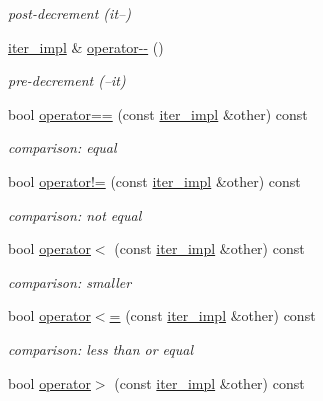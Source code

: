 \begin{DoxyCompactItemize}
\begin{DoxyCompactList}\small\item\em post-\/decrement (it--) \end{DoxyCompactList}\item 
\mbox{\hyperlink{classnlohmann_1_1detail_1_1iter__impl}{iter\+\_\+impl}} \& \mbox{\hyperlink{classnlohmann_1_1detail_1_1iter__impl_a84e689fb581d651d130039f7cb81494a}{operator-\/-\/}} ()
\begin{DoxyCompactList}\small\item\em pre-\/decrement (--it) \end{DoxyCompactList}\item 
bool \mbox{\hyperlink{classnlohmann_1_1detail_1_1iter__impl_a2b592605b63ae7f5401996ffa3b14393}{operator==}} (const \mbox{\hyperlink{classnlohmann_1_1detail_1_1iter__impl}{iter\+\_\+impl}} \&other) const
\begin{DoxyCompactList}\small\item\em comparison\+: equal \end{DoxyCompactList}\item 
bool \mbox{\hyperlink{classnlohmann_1_1detail_1_1iter__impl_aeab0e2b5da70b3bdebecd5b1a6ee66a6}{operator!=}} (const \mbox{\hyperlink{classnlohmann_1_1detail_1_1iter__impl}{iter\+\_\+impl}} \&other) const
\begin{DoxyCompactList}\small\item\em comparison\+: not equal \end{DoxyCompactList}\item 
bool \mbox{\hyperlink{classnlohmann_1_1detail_1_1iter__impl_a0d14cd76203e00bdcef6a64a5d055cc7}{operator$<$}} (const \mbox{\hyperlink{classnlohmann_1_1detail_1_1iter__impl}{iter\+\_\+impl}} \&other) const
\begin{DoxyCompactList}\small\item\em comparison\+: smaller \end{DoxyCompactList}\item 
bool \mbox{\hyperlink{classnlohmann_1_1detail_1_1iter__impl_ac6f71b36d7c87e427d1fee83f2600fad}{operator$<$=}} (const \mbox{\hyperlink{classnlohmann_1_1detail_1_1iter__impl}{iter\+\_\+impl}} \&other) const
\begin{DoxyCompactList}\small\item\em comparison\+: less than or equal \end{DoxyCompactList}\item 
bool \mbox{\hyperlink{classnlohmann_1_1detail_1_1iter__impl_aaf3620b8dfa4bed8a9ac2b51dd55dbd7}{operator$>$}} (const \mbox{\hyperlink{classnlohmann_1_1detail_1_1iter__impl}{iter\+\_\+impl}} \&other) const

\end{DoxyCompactItemize}
